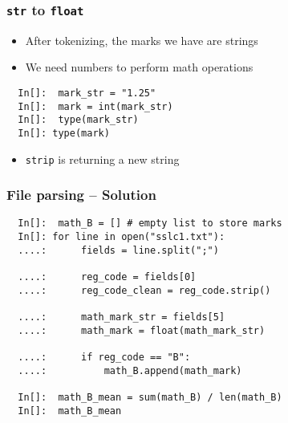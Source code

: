 \begin{frame}[fragile]
  \frametitle{\texttt{str} to \texttt{float}}
  \begin{itemize}
  \item After tokenizing, the marks we have are strings
  \item We need numbers to perform math operations
  \end{itemize}
  \begin{lstlisting}
  In[]:  mark_str = "1.25"
  In[]:  mark = int(mark_str)
  In[]:  type(mark_str)
  In[]: type(mark)
  \end{lstlisting}
  \begin{itemize}
  \item \texttt{strip} is returning a new string 
  \end{itemize}
\end{frame}

\begin{frame}[fragile]
  \frametitle{File parsing -- Solution}
  \begin{lstlisting}
  In[]:  math_B = [] # empty list to store marks
  In[]: for line in open("sslc1.txt"):
  ....:      fields = line.split(";")

  ....:      reg_code = fields[0]
  ....:      reg_code_clean = reg_code.strip()

  ....:      math_mark_str = fields[5]
  ....:      math_mark = float(math_mark_str)

  ....:      if reg_code == "B":
  ....:          math_B.append(math_mark)

  In[]:  math_B_mean = sum(math_B) / len(math_B)
  In[]:  math_B_mean
  \end{lstlisting}
\end{frame}
